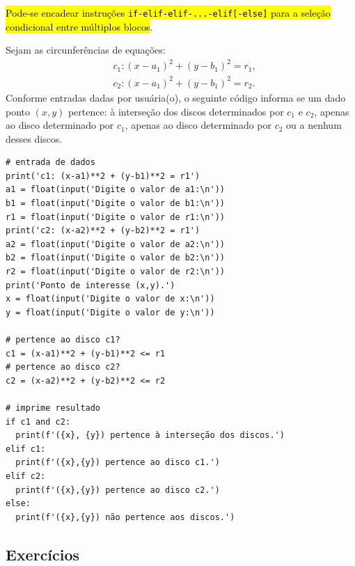 \hl{Pode-se encadear instruções \texttt{if-elif-elif-...-elif[-else]} para a seleção condicional entre múltiplos blocos}.

\begin{ex}
  Sejam as circunferências de equações:
  \begin{align}
    & c_1: (x-a_1)^2 + (y-b_1)^2 = r_1, \\
    & c_2: (x-a_1)^2 + (y-b_1)^2 = r_2.
  \end{align}
  Conforme entradas dadas por usuária(o), o seguinte código informa se um dado ponto $(x, y)$ pertence: à interseção dos discos determinados por $c_1$ e $c_2$, apenas ao disco determinado por $c_1$, apenas ao disco determinado por $c_2$ ou a nenhum desses discos.

\begin{lstlisting}
# entrada de dados
print('c1: (x-a1)**2 + (y-b1)**2 = r1')
a1 = float(input('Digite o valor de a1:\n'))
b1 = float(input('Digite o valor de b1:\n'))
r1 = float(input('Digite o valor de r1:\n'))
print('c2: (x-a2)**2 + (y-b2)**2 = r1')
a2 = float(input('Digite o valor de a2:\n'))
b2 = float(input('Digite o valor de b2:\n'))
r2 = float(input('Digite o valor de r2:\n'))
print('Ponto de interesse (x,y).')
x = float(input('Digite o valor de x:\n'))
y = float(input('Digite o valor de y:\n'))

# pertence ao disco c1?
c1 = (x-a1)**2 + (y-b1)**2 <= r1
# pertence ao disco c2?
c2 = (x-a2)**2 + (y-b2)**2 <= r2

# imprime resultado
if c1 and c2:
  print(f'({x}, {y}) pertence à interseção dos discos.')
elif c1:
  print(f'({x},{y}) pertence ao disco c1.')
elif c2:
  print(f'({x},{y}) pertence ao disco c2.')
else:
  print(f'({x},{y}) não pertence aos discos.')
\end{lstlisting}

\end{ex}


\subsection{Exercícios}


